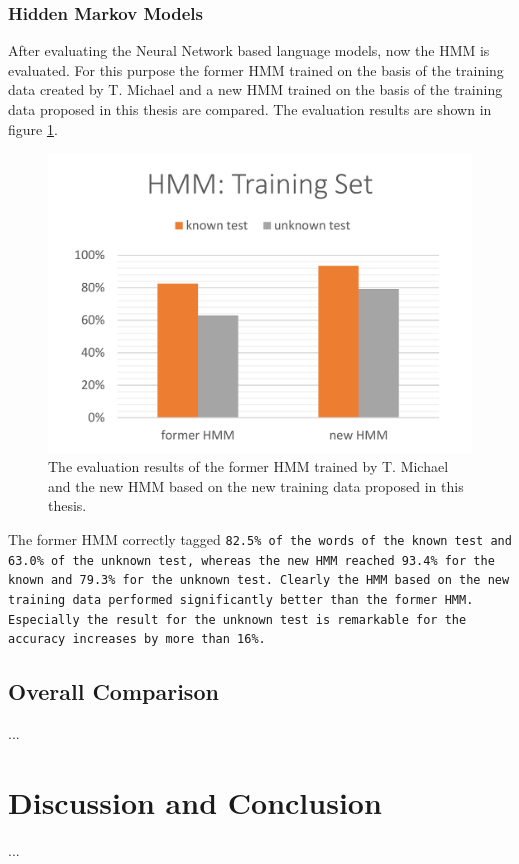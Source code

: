 \subsection{Hidden Markov Models}\label{c.evaluation.results.hmm}
After evaluating the Neural Network based language models, now the HMM is evaluated. For this purpose the former HMM trained on the basis of the training data created by T. Michael \cite{michael2016} and a new HMM trained on the basis of the training data proposed in this thesis are compared. The evaluation results are shown in figure \ref{f.evaluation.hmm}.

\begin{figure}[H]
	\centering\includegraphics[width=.7\textwidth]{images/evaluation_hmm}
	\caption[HMM Evaluation]{The evaluation results of the former HMM trained by T. Michael \cite{michael2016} and the new HMM based on the new training data proposed in this thesis.}
	\label{f.evaluation.hmm}
\end{figure}

The former HMM correctly tagged \tt{82.5\%} of the words of the known test and \tt{63.0\%} of the unknown test, whereas the new HMM reached \tt{93.4\%} for the known and \tt{79.3\%} for the unknown test. Clearly the HMM based on the new training data performed significantly better than the former HMM. Especially the result for the unknown test is remarkable for the accuracy increases by more than \tt{16\%}.

\section{Overall Comparison}\label{c.evaluation.comparison}
...

\chapter{Discussion and Conclusion}\label{c.conclusion}
...

